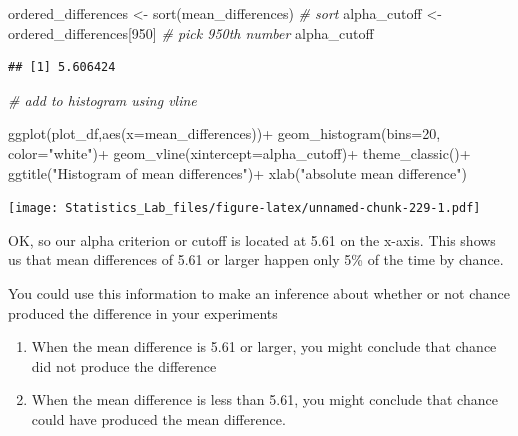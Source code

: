 \documentclass[
]{book}
\newenvironment{Shaded}{\begin{snugshade}}{\end{snugshade}}
\newcommand{\AttributeTok}[1]{\textcolor[rgb]{0.77,0.63,0.00}{#1}}
\newcommand{\CommentTok}[1]{\textcolor[rgb]{0.56,0.35,0.01}{\textit{#1}}}
\newcommand{\DecValTok}[1]{\textcolor[rgb]{0.00,0.00,0.81}{#1}}
\newcommand{\FunctionTok}[1]{\textcolor[rgb]{0.00,0.00,0.00}{#1}}
\newcommand{\NormalTok}[1]{#1}
\newcommand{\OtherTok}[1]{\textcolor[rgb]{0.56,0.35,0.01}{#1}}
\newcommand{\SpecialCharTok}[1]{\textcolor[rgb]{0.00,0.00,0.00}{#1}}
\newcommand{\StringTok}[1]{\textcolor[rgb]{0.31,0.60,0.02}{#1}}
\begin{document}
\begin{Shaded}
\begin{Highlighting}[]
\NormalTok{ordered\_differences }\OtherTok{\textless{}{-}} \FunctionTok{sort}\NormalTok{(mean\_differences) }\CommentTok{\# sort}
\NormalTok{alpha\_cutoff }\OtherTok{\textless{}{-}}\NormalTok{ ordered\_differences[}\DecValTok{950}\NormalTok{] }\CommentTok{\# pick 950th number}
\NormalTok{alpha\_cutoff}
\end{Highlighting}
\end{Shaded}

\begin{verbatim}
## [1] 5.606424
\end{verbatim}

\begin{Shaded}
\begin{Highlighting}[]
\CommentTok{\# add to histogram using vline}

\FunctionTok{ggplot}\NormalTok{(plot\_df,}\FunctionTok{aes}\NormalTok{(}\AttributeTok{x=}\NormalTok{mean\_differences))}\SpecialCharTok{+}
  \FunctionTok{geom\_histogram}\NormalTok{(}\AttributeTok{bins=}\DecValTok{20}\NormalTok{, }\AttributeTok{color=}\StringTok{"white"}\NormalTok{)}\SpecialCharTok{+}
  \FunctionTok{geom\_vline}\NormalTok{(}\AttributeTok{xintercept=}\NormalTok{alpha\_cutoff)}\SpecialCharTok{+}
  \FunctionTok{theme\_classic}\NormalTok{()}\SpecialCharTok{+}
  \FunctionTok{ggtitle}\NormalTok{(}\StringTok{"Histogram of mean differences"}\NormalTok{)}\SpecialCharTok{+}
  \FunctionTok{xlab}\NormalTok{(}\StringTok{"absolute mean difference"}\NormalTok{)}
\end{Highlighting}
\end{Shaded}

\texttt{[image: Statistics\_Lab\_files/figure-latex/unnamed-chunk-229-1.pdf]}

OK, so our alpha criterion or cutoff is located at 5.61 on the x-axis. This shows us that mean differences of 5.61 or larger happen only 5\% of the time by chance.

You could use this information to make an inference about whether or not chance produced the difference in your experiments

\begin{enumerate}
\def\labelenumi{\arabic{enumi}.}
\item
  When the mean difference is 5.61 or larger, you might conclude that chance did not produce the difference
\item
  When the mean difference is less than 5.61, you might conclude that chance could have produced the mean difference.
\end{enumerate}
\end{document}
